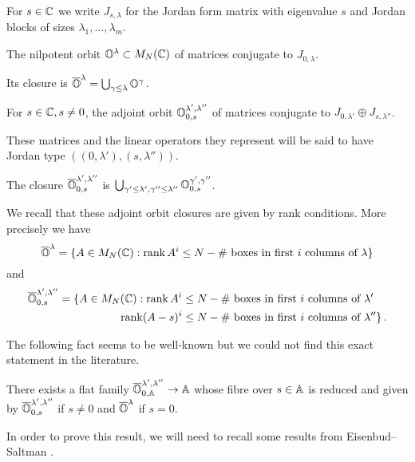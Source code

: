 \documentclass[draft]{article}
\begin{document}
For $ s \in \CC$ we write $ J_{s,\lambda}$ for the Jordan form matrix with eigenvalue $ s$ and Jordan blocks of sizes $ \lambda_1, \dots, \lambda_m$.
    
\begin{definition}
\label{def:Olam}
The nilpotent orbit $ \OO^\lambda \subset M_N(\CC)$ of matrices conjugate to $ J_{0,\lambda}$.
\end{definition}  
% 
Its closure is $ \overline{\OO}^\lambda = \bigcup_{\gamma \le \lambda} \OO^{\gamma}$.
% 
\begin{definition}
\label{def:Olamlam}
    For $ s \in \CC, s \ne 0$, the adjoint orbit $ \OO^{\lambda', \lambda''}_{0,s}$ of matrices conjugate to $ J_{0,\lambda'} \oplus J_{s,\lambda''}$.
\end{definition}  
% 
These matrices and the linear operators they represent will be said to have Jordan type $((0,\lambda'), (s,\lambda''))$.

% 

The closure $ \overline{\OO}^{\lambda', \lambda''}_{0,s}$ is $\bigcup_{\gamma' \le \lambda', \gamma'' \le \lambda''} \OO^{\gamma', \gamma''}_{0,s}$.     
     
We recall that these adjoint orbit closures are given by rank conditions.  
More precisely we have
$$
    \overline{\OO}^\lambda = \{ A \in M_N(\CC) : \rk A^i \le N - \#\text{~boxes in first $i$ columns of }\lambda \}
$$
and
\begin{equation} 
\label{eq:ranks}
\begin{split}
    \overline{\OO}^{\lambda', \lambda''}_{0,s} = \{ A \in M_N(\CC) : \rk A^i &\le N - 
    \#\text{~boxes in first $i$ columns of }\lambda' \\
    \rk (A-s)^i &\le N - \#\text{~boxes in first $i$ columns of }\lambda'' \}\,. 
\end{split}
\end{equation}
%  

The following fact seems to be well-known but we could not find this exact statement in the literature.
\begin{proposition} 
    \label{prop:adjoint}
    There exists a flat family $\overline{\OO}^{\lambda', \lambda''}_{0,\AA} \rightarrow \AA$ whose fibre over $s \in \AA$ is reduced and given by $\overline{\OO}^{\lambda', \lambda''}_{0,s}$ if $s \ne 0 $ and $\overline{\OO}^\lambda $ if $ s = 0$.
\end{proposition}
% 
In order to prove this result, we will need to recall some results from Eisenbud--Saltman \cite{eisenbud1989rank}.
% 
\end{document}

